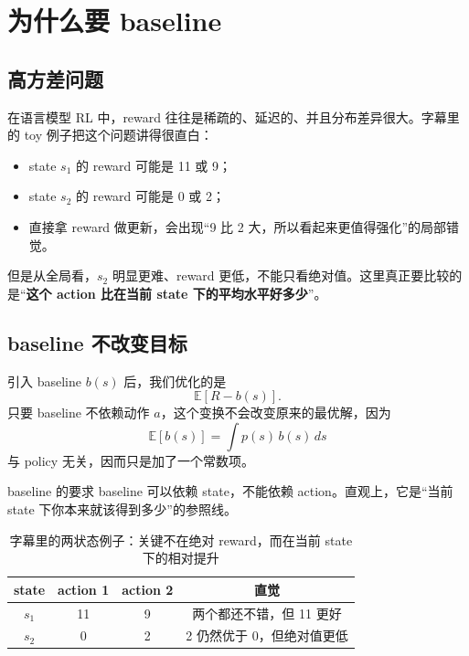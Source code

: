 \section{为什么要 baseline}

\subsection{高方差问题}

在语言模型 RL 中，reward 往往是稀疏的、延迟的、并且分布差异很大。字幕里的 toy 例子把这个问题讲得很直白：

\begin{itemize}
    \item state $s_1$ 的 reward 可能是 11 或 9；
    \item state $s_2$ 的 reward 可能是 0 或 2；
    \item 直接拿 reward 做更新，会出现“9 比 2 大，所以看起来更值得强化”的局部错觉。
\end{itemize}

但是从全局看，$s_2$ 明显更难、reward 更低，不能只看绝对值。这里真正要比较的是“\textbf{这个 action 比在当前 state 下的平均水平好多少}”。

\subsection{baseline 不改变目标}

引入 baseline $b(s)$ 后，我们优化的是
\[
\mathbb{E}[R - b(s)].
\]
只要 baseline 不依赖动作 $a$，这个变换不会改变原来的最优解，因为
\[
\mathbb{E}[b(s)] = \int p(s)\,b(s)\,ds
\]
与 policy 无关，因而只是加了一个常数项。

\begin{knowledgebox}{baseline 的要求}
baseline 可以依赖 state，不能依赖 action。直观上，它是“当前 state 下你本来就该得到多少”的参照线。
\end{knowledgebox}

\begin{table}[H]
\centering
\begin{tabular}{@{}cccc@{}}
\toprule
\textbf{state} & \textbf{action 1} & \textbf{action 2} & \textbf{直觉} \\
\midrule
$s_1$ & 11 & 9 & 两个都还不错，但 11 更好 \\
$s_2$ & 0 & 2 & 2 仍然优于 0，但绝对值更低 \\
\bottomrule
\end{tabular}
\caption{字幕里的两状态例子：关键不在绝对 reward，而在当前 state 下的相对提升}
\end{table}

